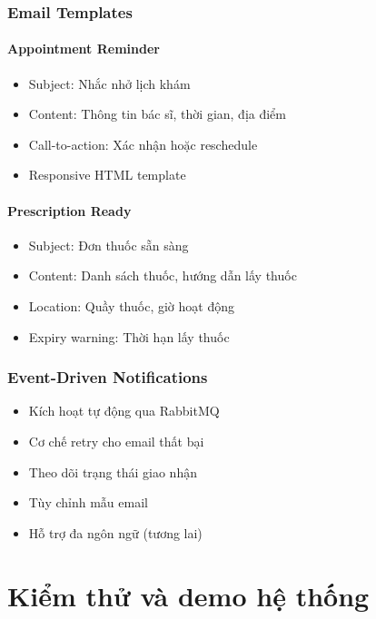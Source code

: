 \documentclass[12pt,a4paper]{report}
\begin{document}
    \subsection{Email Templates}
    \subsubsection{Appointment Reminder}
    \begin{itemize}
        \item Subject: Nhắc nhở lịch khám
        \item Content: Thông tin bác sĩ, thời gian, địa điểm
        \item Call-to-action: Xác nhận hoặc reschedule
        \item Responsive HTML template
    \end{itemize}

    \subsubsection{Prescription Ready}
    \begin{itemize}
        \item Subject: Đơn thuốc sẵn sàng
        \item Content: Danh sách thuốc, hướng dẫn lấy thuốc
        \item Location: Quầy thuốc, giờ hoạt động
        \item Expiry warning: Thời hạn lấy thuốc
    \end{itemize}

    \subsection{Event-Driven Notifications}
    \begin{itemize}
        \item Kích hoạt tự động qua RabbitMQ
        \item Cơ chế retry cho email thất bại
        \item Theo dõi trạng thái giao nhận
        \item Tùy chỉnh mẫu email
        \item Hỗ trợ đa ngôn ngữ (tương lai)
    \end{itemize}

    \chapter{Kiểm thử và demo hệ thống}
\end{document}

